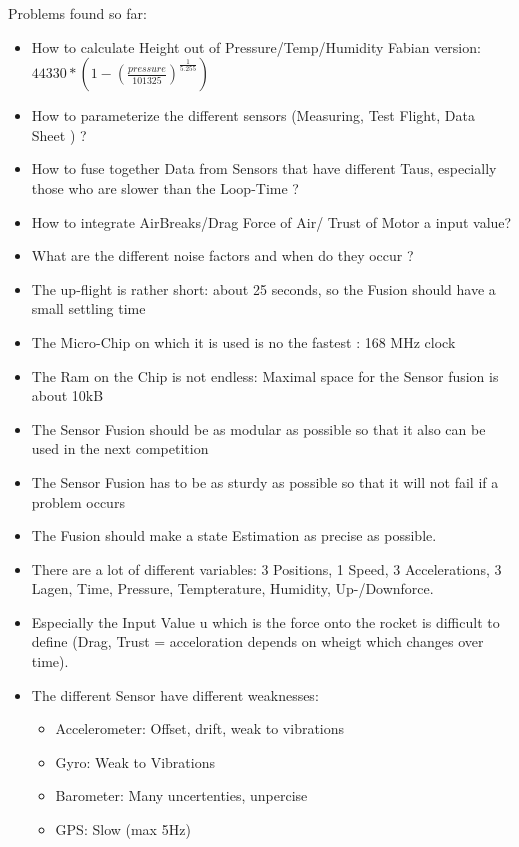  Problems found so far:
 \begin{itemize}
  \item How to calculate Height out of Pressure/Temp/Humidity Fabian version: $44330 * (1 - (\frac{pressure}{101325})^{ \frac{1}{5.255}})$
  \item How to parameterize the different sensors (Measuring, Test Flight, Data Sheet ) ? 
  \item How to fuse together Data from Sensors that have different Taus, especially those who are slower than the Loop-Time ?
  \item How to integrate AirBreaks/Drag Force of Air/ Trust of Motor a input value?
  \item What are the different noise factors and when do they occur ?
  \item The up-flight is rather short: about 25 seconds, so the Fusion should have a small settling time
  \item The Micro-Chip on which it is used is no the fastest : 168 MHz clock
  \item The Ram on the Chip is not endless: Maximal space for the Sensor fusion is about 10kB
  \item The Sensor Fusion should be as modular as possible so that it also can be used in the next competition
  \item The Sensor Fusion has to be as sturdy as possible so that it will not fail if a problem occurs
  \item The Fusion should make a state Estimation as precise as possible.
  \item There are a lot of different variables: 3 Positions, 1 Speed, 3 Accelerations, 3 Lagen, Time, Pressure, Tempterature, Humidity, Up-/Downforce.
  \item Especially the Input Value u which is the force onto the rocket is difficult to define (Drag, Trust = acceloration depends on wheigt which changes over time).
  \item The different Sensor have different weaknesses: \begin{itemize}
							 \item Accelerometer: Offset, drift, weak to vibrations
                                                         \item Gyro: Weak to Vibrations
                                                         \item Barometer: Many uncertenties, unpercise
                                                         \item GPS: Slow (max 5Hz)
                                                        \end{itemize}
                                                        
								  
 \end{itemize}
 
